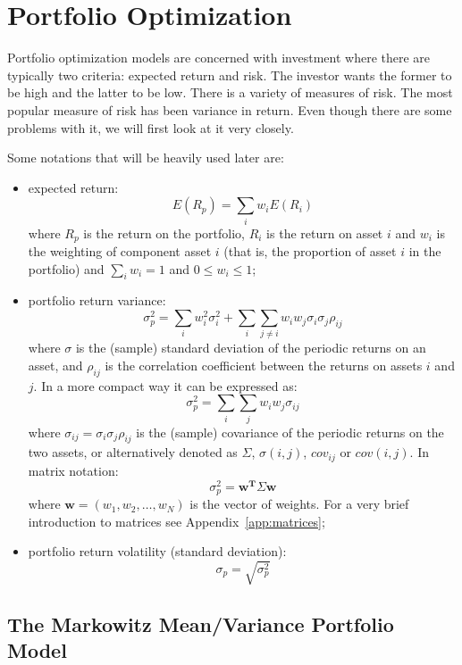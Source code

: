 \chapter{Portfolio Optimization}\label{portfolio-optimization}

Portfolio optimization models are concerned with investment where there
are typically two criteria: expected return and risk. The investor wants
the former to be high and the latter to be low. There is a variety of
measures of risk. The most popular measure of risk has been variance in
return. Even though there are some problems with it, we will first look
at it very closely.

Some notations that will be heavily used later are:

\begin{itemize}
\tightlist
\item
  expected return: \[ E(R_{p}) = \sum _{i}w_{i} E(R_{i}) \] where
  \(R_{p}\) is the return on the portfolio, \(R_{i}\) is the return on
  asset \(i\) and \(w_{i}\) is the weighting of component asset \(i\)
  (that is, the proportion of asset \(i\) in the portfolio) and
  \(\sum_{i}w_i = 1\) and \(0 \le w_i \le 1\);
\item
  portfolio return variance:
  \[ \sigma _{p}^{2} = \sum _{i}w_{i}^{2}\sigma _{i}^{2} + \sum _{i}\sum _{j\neq i}w_{i}w_{j}\sigma _{i}\sigma _{j}\rho _{ij} \]
  where \(\sigma\) is the (sample) standard deviation of the periodic
  returns on an asset, and \(\rho _{ij}\) is the correlation coefficient
  between the returns on assets \(i\) and \(j\). In a more compact way
  it can be expressed as:
  \[ \sigma _{p}^{2}=\sum _{i}\sum _{j}w_{i}w_{j}\sigma _{ij} \] where
  \(\sigma _{ij}=\sigma _{i}\sigma _{j}\rho _{ij}\) is the (sample)
  covariance of the periodic returns on the two assets, or alternatively
  denoted as \(\Sigma\), \(\sigma (i,j)\), \(cov_{ij}\) or \(cov(i,j)\).
  In matrix notation:
  \[\sigma_p^2 = \mathbf{w^T}\Sigma\mathbf{w} \]
  where $\mathbf{w} = (w_1,w_2,\ldots,w_N)$ is the vector of weights. For a very brief introduction
  to matrices see Appendix~\ref{app:matrices};
\item
  portfolio return volatility (standard deviation):
  \[ \sigma _{p}= \sqrt{\sigma _{p}^{2}}\]
\end{itemize}

\section{The Markowitz Mean/Variance Portfolio
Model}\label{the-markowitz-meanvariance-portfolio-model}


